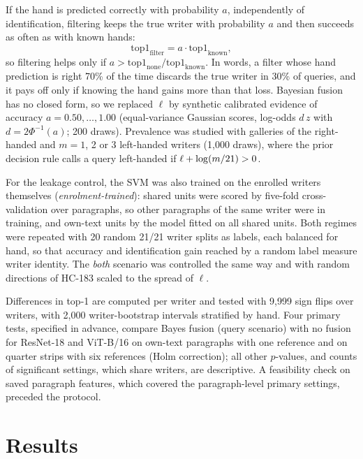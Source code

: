 \documentclass[conference,a4paper]{IEEEtran}
\begin{document}
If the hand is predicted correctly with probability $a$, independently of identification, filtering keeps the true writer with probability $a$ and then succeeds as often as with known hands:
\begin{equation}
\mathrm{top1}_{\mathrm{filter}} = a \cdot \mathrm{top1}_{\mathrm{known}},
\label{eq:law}
\end{equation}
so filtering helps only if $a > \mathrm{top1}_{\mathrm{none}}/\mathrm{top1}_{\mathrm{known}}$. In words, a filter whose hand prediction is right 70\% of the time discards the true writer in 30\% of queries, and it pays off only if knowing the hand gains more than that loss. Bayesian fusion has no closed form, so we replaced $\ell$ by synthetic calibrated evidence of accuracy $a=0.50,\dots,1.00$ (equal-variance Gaussian scores, log-odds $d\,z$ with $d=2\Phi^{-1}(a)$; 200 draws). Prevalence was studied with galleries of the \vnRight{} right-handed and $m=1$, 2 or 3 left-handed writers (1,000 draws), where the prior decision rule calls a query left-handed if $\ell+\log(m/21)>0$.

For the leakage control, the SVM was also trained on the enrolled writers themselves (\emph{enrolment-trained}): shared units were scored by five-fold cross-validation over paragraphs, so other paragraphs of the same writer were in training, and own-text units by the model fitted on all shared units. Both regimes were repeated with 20 random 21/21 writer splits as labels, each balanced for hand, so that accuracy and identification gain reached by a random label measure writer identity. The \emph{both} scenario was controlled the same way and with random directions of HC-183 scaled to the spread of $\ell$.

Differences in top-1 are computed per writer and tested with 9,999 sign flips over writers, with 2,000 writer-bootstrap intervals stratified by hand. Four primary tests, specified in advance, compare Bayes fusion (query scenario) with no fusion for ResNet-18 and ViT-B/16 on own-text paragraphs with one reference and on quarter strips with six references (Holm correction); all other $p$-values, and counts of significant settings, which share writers, are descriptive. A feasibility check on saved paragraph features, which covered the paragraph-level primary settings, preceded the protocol.

\section{Results}
\end{document}
